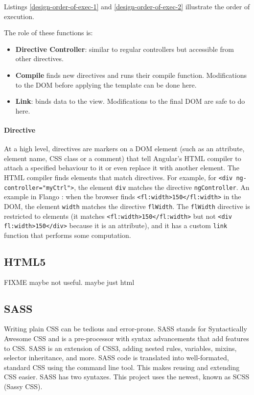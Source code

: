 Listings \ref{design-order-of-exec-1} and \ref{design-order-of-exec-2} illustrate the order of execution.





The role of these functions is:
\begin{itemize}
\item \textbf{Directive Controller}: similar to regular controllers but accessible from other directives. 
\item \textbf{Compile} finds new directives and runs their compile function. Modifications to the \ac{DOM} before applying the template can be done here.
\item \textbf{Link}: binds data to the view. Modifications to the final \ac{DOM} are safe to do here.
\end{itemize}

\paragraph{Directive} At a high level, directives are markers on a \ac{DOM} element (such as an attribute, element name, \ac{CSS} class or a comment) that tell Angular's \ac{HTML} compiler to attach a specified behaviour to it or even replace it with another element.
The \ac{HTML} compiler finds elements that match directives. 
For example, for \lstinline$<div ng-controller="myCtrl">$, the element \texttt{div} matches the directive \texttt{ngController}.
An example in Flango \cm : when the browser finds \lstinline$<fl:width>150</fl:width>$ in the \ac{DOM}, the element \texttt{width} matches the directive \texttt{flWidth}.
The \texttt{flWidth} directive is restricted to elements (it matches \lstinline$<fl:width>150</fl:width>$ but not \lstinline$<div fl:width>150</div>$ because it is an attribute), and it has a custom \texttt{link} function that performs some computation.

    
\subsection{HTML5}
FIXME maybe not useful. maybe just html

\subsection{SASS}
Writing plain \ac{CSS} can be tedious and error-prone.
SASS stands for Syntactically Awesome \ac{CSS} and is a pre-processor with syntax advancements that add features to \ac{CSS}.
SASS is an extension of \ac{CSS3}, adding nested rules, variables, mixins, selector inheritance, and more.
SASS code is translated into well-formated, standard \ac{CSS} using the command line tool.
This makes reusing and extending \ac{CSS} easier.
SASS has two syntaxes.
This project uses the newest, known as \ac{SCSS} (Sassy CSS).

